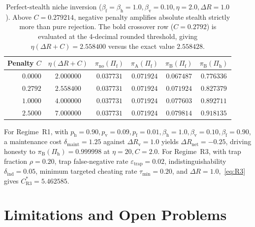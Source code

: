 \documentclass[11pt,a4paper]{article}
\begin{document}
\begin{table}[ht]
\centering
\caption{Perfect-stealth niche inversion ($\beta_{\mathrm{f}} = \beta_{\mathrm{h}} = 1.0, \beta_{\mathrm{v}} = 0.10, \eta = 2.0, \Delta R = 1.0$). Above $C = 0.279214$, negative penalty amplifies absolute stealth strictly more than pure rejection. The bold crossover row ($C = 0.2792$) is evaluated at the 4-decimal rounded threshold, giving $\eta(\Delta R + C) = 2.558400$ versus the exact value $2.558428$.}
\label{tab:niche}
\small
\begin{tabular}{@{}rccccc@{}}
\toprule
Penalty $C$ & $\eta(\Delta R + C)$ & $\pi_{\mathrm{no}}(\Pi_{\mathrm{f}})$ & $\pi_{\mathrm{A}}(\Pi_{\mathrm{f}})$ & $\pi_{\mathrm{B}}(\Pi_{\mathrm{f}})$ & $\pi_{\mathrm{B}}(\Pi_{\mathrm{h}})$ \\
\midrule
$0.0000$ & $2.000000$ & $0.037731$ & $0.071924$ & $0.067487$ & $0.776336$ \\
$\mathbf{0.2792}$ & $\mathbf{2.558400}$ & $0.037731$ & $\mathbf{0.071924}$ & $\mathbf{0.071924}$ & $0.827379$ \\
$1.0000$ & $4.000000$ & $0.037731$ & $0.071924$ & $0.077603$ & $0.892711$ \\
$2.5000$ & $7.000000$ & $0.037731$ & $0.071924$ & $\mathbf{0.079814}$ & $0.918135$ \\
\bottomrule
\end{tabular}
\end{table}

For Regime~R1, with $p_{\mathrm{h}} = 0.90, p_{\mathrm{v}} = 0.09, p_{\mathrm{f}} = 0.01, \beta_{\mathrm{h}} = 1.0, \beta_{\mathrm{v}} = 0.10, \beta_{\mathrm{f}} = 0.90$, a maintenance cost $\delta_{\mathrm{maint}} = 1.25$ against $\Delta R_{\mathrm{v}} = 1.0$ yields $\Delta R_{\mathrm{net}} = -0.25$, driving honesty to $\pi_{\mathrm{B}}(\Pi_{\mathrm{h}}) = 0.999998$ at $\eta = 20, C = 2.0$. For Regime~R3, with trap fraction $\rho = 0.20$, trap false-negative rate $\varepsilon_{\mathrm{trap}} = 0.02$, indistinguishability $\delta_{\mathrm{ind}} = 0.05$, minimum targeted cheating rate $\tau_{\min} = 0.20$, and $\Delta R = 1.0$,~\eqref{eq:R3} gives $C_{\mathrm{R3}}^* = 5.462585$.

\section{Limitations and Open Problems}
\end{document}
